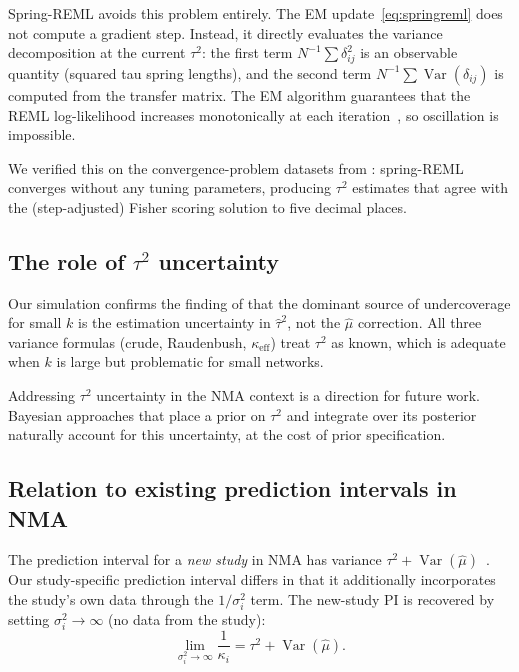 \documentclass[12pt]{article}
\newcommand{\Var}{\operatorname{Var}}
\begin{document}
Spring-REML avoids this problem entirely.  The EM
update~\eqref{eq:springreml} does not compute a gradient step.  Instead,
it directly evaluates the variance decomposition at the current $\tau^2$:
the first term $N^{-1}\sum\delta_{ij}^2$ is an observable quantity
(squared tau spring lengths), and the second term
$N^{-1}\sum\Var(\delta_{ij})$ is computed from the transfer matrix.
The EM algorithm guarantees that the REML log-likelihood increases
monotonically at each iteration~\citep{DempsterLairdRubin1977}, so
oscillation is impossible.

We verified this on the convergence-problem
datasets from \citet{Viechtbauer2005convergence}: spring-REML converges
without any tuning parameters, producing $\tau^2$ estimates that agree
with the (step-adjusted) Fisher scoring solution to five decimal places.

\subsection{The role of $\tau^2$ uncertainty}

Our simulation confirms the finding of \citet{vanAert2021} that the
dominant source of undercoverage for small $k$ is the estimation
uncertainty in $\hat\tau^2$, not the $\hat\mu$ correction.  All three
variance formulas (crude, Raudenbush, $\kappa_{\mathrm{eff}}$) treat
$\tau^2$ as known, which is adequate when $k$ is large but problematic
for small networks.

Addressing $\tau^2$ uncertainty in the NMA context is a direction for
future work.  Bayesian approaches that place a prior on $\tau^2$ and
integrate over its posterior naturally account for this uncertainty, at
the cost of prior specification.

\subsection{Relation to existing prediction intervals in NMA}

The prediction interval for a \emph{new study} in NMA has variance
$\tau^2 + \Var(\hat\mu)$~\citep{Riley2011}.  Our study-specific
prediction interval differs in that it additionally incorporates the
study's own data through the $1/\sigma_i^2$ term.  The new-study PI
is recovered by setting $\sigma_i^2 \to \infty$ (no data from the
study):
\begin{equation}
  \lim_{\sigma_i^2 \to \infty} \frac{1}{\kappa_i}
    = \tau^2 + \Var(\hat\mu).
\end{equation}
\end{document}
